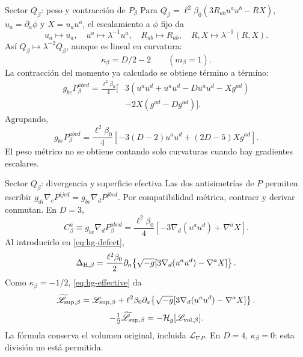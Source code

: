\begin{frame}[label=holo-gen-07]{Sector $Q_\beta$: peso y contracción de $P_\beta$}
\footnotesize\CompactDisplaySpacing
Para $Q_\beta=\ell^2\beta_0(3R_{ab}u^au^b-RX)$, $u_a=\partial_a\phi$ y $X=u_au^a$, el escalamiento a $\phi$ fijo da
\[
u_a\mapsto u_a,\quad u^a\mapsto\lambda^{-1}u^a,\quad
R_{ab}\mapsto R_{ab},\quad R,X\mapsto\lambda^{-1}(R,X).
\]
Así $Q_\beta\mapsto\lambda^{-2}Q_\beta$, aunque es lineal en curvatura:
\begin{equation}
\kappa_\beta=D/2-2\qquad (m_\beta=1).
\label{eq:hg-beta-weight}
\end{equation}
La contracción del momento ya calculado se obtiene término a término:
\[
\begin{aligned}
g_{bc}P_\beta^{abcd}
=\frac{\ell^2\beta_0}{4}\big[&3(u^au^d+u^au^d-Du^au^d-Xg^{ad})\\
&-2X(g^{ad}-Dg^{ad})\big].
\end{aligned}
\]
Agrupando,
\begin{equation}
g_{bc}P_\beta^{abcd}
=\frac{\ell^2\beta_0}{4}[-3(D-2)u^au^d+(2D-5)Xg^{ad}].
\label{eq:hg-beta-contraction}
\end{equation}
El peso métrico no se obtiene contando solo curvaturas cuando hay gradientes escalares.
\end{frame}
\begin{frame}[label=holo-gen-08]{Sector $Q_\beta$: divergencia y superficie efectiva}
\footnotesize\CompactDisplaySpacing
Las dos antisimetrías de $P$ permiten escribir
$g_{di}\nabla_cP^{ijcd}=g_{bc}\nabla_dP^{jbcd}$.
Por compatibilidad métrica, contraer y derivar conmutan. En $D=3$,
\[
C_\beta^a\equiv g_{bc}\nabla_dP_\beta^{abcd}
=\frac{\ell^2\beta_0}{4}[-3\nabla_d(u^au^d)+\nabla^aX].
\]
Al introducirlo en \eqref{eq:hg-defect},
\begin{equation}
\Delta_{{\rm H},\beta}
=\frac{\ell^2\beta_0}{2}\partial_a\!\left\{\sqrt{-g}
[3\nabla_d(u^au^d)-\nabla^aX]\right\}.
\label{eq:hg-beta-defect}
\end{equation}
Como $\kappa_\beta=-1/2$, \eqref{eq:hg-effective} da
\begin{equation}
\widetilde{\mathscr L}_{{\rm sup},\beta}
=\mathscr L_{{\rm sup},\beta}+\ell^2\beta_0\partial_a\!\left\{\sqrt{-g}
[3\nabla_d(u^au^d)-\nabla^aX]\right\}.
\label{eq:hg-beta-effective}
\end{equation}
\[
-\tfrac12\widetilde{\mathscr L}_{{\rm sup},\beta}
=-\mathcal H_g[\mathscr L_{{\rm vol},\beta}].
\]
La fórmula conserva el volumen original, incluida $\mathscr L_{\nabla P}$. En $D=4$, $\kappa_\beta=0$: esta división no está permitida.
\end{frame}
